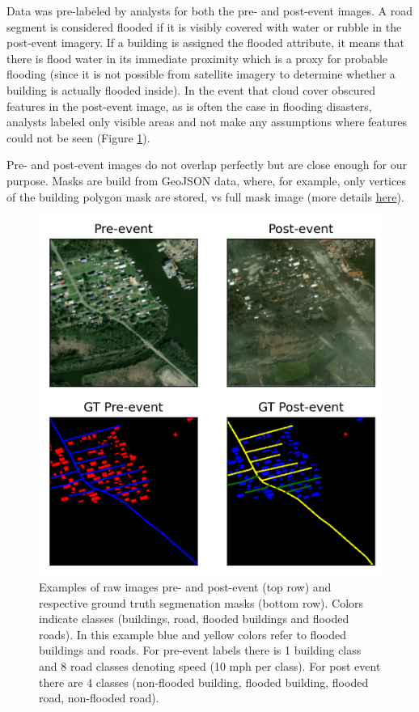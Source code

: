 \documentclass[10pt,twocolumn,letterpaper]{article}
\begin{document}
Data was pre-labeled by analysts for both the pre- and post-event images. A road segment is considered flooded if it is visibly covered with water or rubble in the post-event imagery. If a building is assigned the flooded attribute, it means that there is flood water in its immediate proximity which is a proxy for probable flooding (since it is not possible from satellite imagery to determine whether a building is actually flooded inside). In the event that cloud cover obscured features in the post-event image, as is often the case in flooding disasters, analysts labeled only visible areas and not make any assumptions where features could not be seen (Figure \ref{fig:dataset}).

Pre- and post-event images do not overlap perfectly but are close enough for our purpose. Masks are build from GeoJSON data, where, for example, only vertices of the building polygon mask are stored, vs full mask image (more details \href{https://medium.com/the-downlinq/getting-started-with-spacenet-data-827fd2ec9f53}{here}).

\begin{figure}[t]
  \centering
   \includegraphics[width=1.0\linewidth]{figures/dataset.png}
   \caption{Examples of raw images pre- and post-event (top row) and respective ground truth segmenation masks (bottom row). Colors indicate classes (buildings, road, flooded buildings and flooded roads). In this example blue and yellow colors refer to flooded buildings and roads. For pre-event labels there is 1 building class and 8 road classes denoting speed (10 mph per class). For post event there are 4 classes (non-flooded building, flooded building, flooded road, non-flooded road).}
   \label{fig:dataset}
\end{figure}
\end{document}
